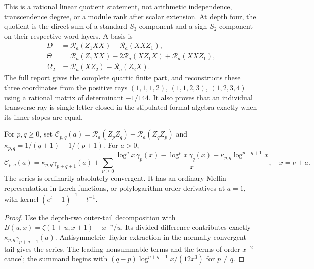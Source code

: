 This is a rational linear quotient statement, not arithmetic independence,
transcendence degree, or a module rank after scalar extension. At depth four,
the quotient is the direct sum of a standard $S_3$ component and a sign
$S_2$ component on their respective word layers. A basis is
\begin{align*}
 D&=\mathcal R_a(Z_1XX)-\mathcal R_a(XXZ_1),\\
 \Theta&=\mathcal R_a(Z_1XX)-2\mathcal R_a(XZ_1X)+\mathcal R_a(XXZ_1),\\
 \Omega_2&=\mathcal R_a(XZ_2)-\mathcal R_a(Z_2X).
\end{align*}
The full report gives the complete quartic finite part, and reconstructs
these three coordinates from the positive rays $(1,1,1,2)$, $(1,1,2,3)$,
$(1,2,3,4)$ using a rational matrix of determinant $-1/144$.
It also proves that an individual transverse ray is single-letter-closed
in the stipulated formal algebra exactly when its inner slopes are equal.

\begin{theorem}\label{ojnf:thm:commutators}
For $p,q\ge0$, set
$\mathcal C_{p,q}(a)=\mathcal R_a(Z_pZ_q)-\mathcal R_a(Z_qZ_p)$ and
$\kappa_{p,q}=1/(q+1)-1/(p+1)$. For $a>0$,
\[
 \mathcal C_{p,q}(a)=\kappa_{p,q}\gamma_{p+q+1}(a)+
 \sum_{\nu\ge0}\frac{\log^q x\,\gamma_p(x)-\log^p x\,\gamma_q(x)
                -\kappa_{p,q}\log^{p+q+1}x}{x},\quad x=\nu+a.
\]
The series is ordinarily absolutely convergent. It has an ordinary Mellin
representation in Lerch functions, or polylogarithm order derivatives at
$a=1$, with kernel $(e^t-1)^{-1}-t^{-1}$.
\end{theorem}
\begin{proof}
Use the depth-two outer-tail decomposition with
$B(u,x)=\zeta(1+u,x+1)-x^{-u}/u$. Its divided difference contributes
exactly $\kappa_{p,q}\gamma_{p+q+1}(a)$. Antisymmetric Taylor extraction
in the normally convergent tail gives the series. The leading nonsummable
terms and the terms of order $x^{-2}$ cancel; the summand begins with
$(q-p)\log^{p+q-1}x/(12x^3)$ for $p\ne q$.
\end{proof}

